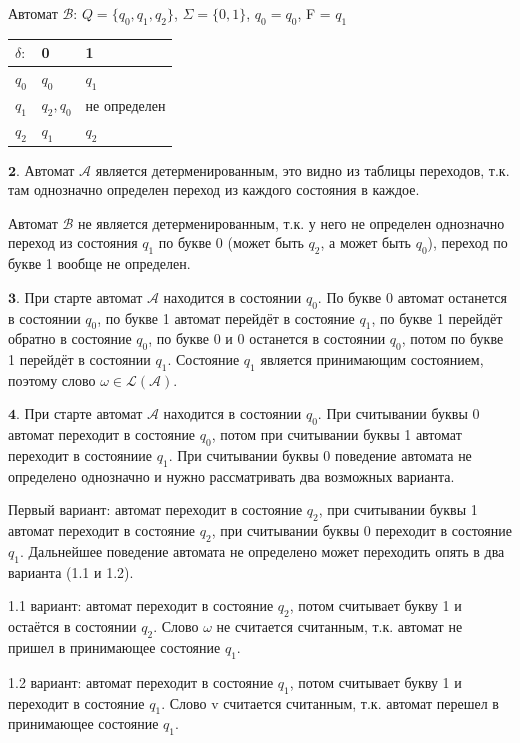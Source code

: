 \documentclass[a4paper,14pt]{article} %
\begin{document}
\vspace{10mm}

Автомат $\mathcal{B}$: $Q = \{q_0, q_1, q_2\}$, $\Sigma = \{0, 1\}$, $q_0 = q_0$, F = $q_1$
\begin{tabular}{ | l | l | l | }
    \hline
    $\delta:$ & 0       & 1             \\ \hline
    $q_0$ & $q_0$       & $q_1$         \\
    $q_1$ & $q_2, q_0$  & не определен  \\
    $q_2$ & $q_1$       & $q_2$         \\
    \hline
    \end{tabular}

\newpage
$\textbf{2.}$ Автомат $\mathcal{A}$ является детерменированным, это видно из таблицы переходов, т.к. там однозначно определен переход из каждого состояния в каждое.

Автомат $\mathcal{B}$ не является детерменированным, т.к. у него не определен однозначно переход из состояния $q_1$ по букве 0 (может быть $q_2$, а может быть $q_0$), переход по букве 1 вообще не определен.

$\textbf{3.}$ При старте автомат $\mathcal{A}$ находится в состоянии $q_0$. По букве 0 автомат останется в состоянии $q_0$, по букве 1 автомат перейдёт в состояние $q_1$, по букве 1 перейдёт обратно в состояние $q_0$,
по букве 0 и 0 останется в состоянии $q_0$, потом по букве 1 перейдёт в состоянии $q_1$. Состояние $q_1$ является принимающим состоянием, поэтому слово $\omega \in \mathcal{L(A)}.$

$\textbf{4.}$ При старте автомат $\mathcal{A}$ находится в состоянии $q_0$. При считывании буквы 0 автомат переходит в состояние $q_0$, потом при считывании буквы 1 автомат переходит в состояниие $q_1$.
При считывании буквы 0 поведение автомата не определено однозначно и нужно рассматривать два возможных варианта.

Первый вариант: автомат переходит в состояние $q_2$, при считывании буквы 1 автомат переходит в состояние $q_2$, при считывании буквы 0 переходит в состояние $q_1$. 
Дальнейшее поведение автомата не определено может переходить опять в два варианта (1.1 и 1.2).

1.1 вариант: автомат переходит в состояние $q_2$, потом считывает букву 1 и остаётся в состоянии $q_2$. Слово $\omega$ не считается считанным, т.к. автомат не пришел в принимающее состояние $q_1$.

1.2 вариант: автомат переходит в состояние $q_1$, потом считывает букву 1 и переходит в состояние $q_1$. Слово v считается считанным, т.к. автомат перешел в принимающее состояние $q_1$.
\end{document}

